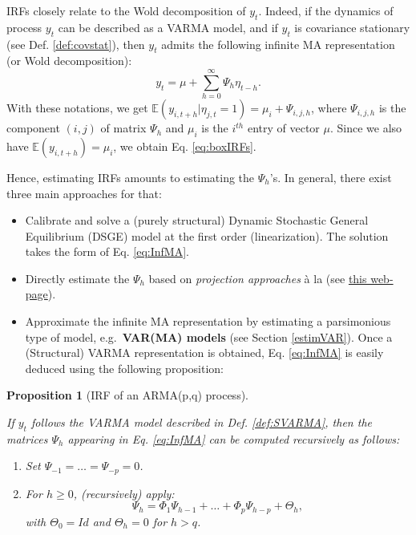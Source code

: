 \documentclass[
  12pt,
]{book}
\providecommand{\tightlist}{%
  \setlength{\itemsep}{0pt}\setlength{\parskip}{0pt}}
\newtheorem{proposition}{Proposition}[chapter]
\theoremstyle{definition}
\theoremstyle{definition}
\theoremstyle{definition}
\theoremstyle{definition}
\theoremstyle{remark}
\begin{document}
IRFs closely relate to the Wold decomposition of \(y_t\). Indeed, if the dynamics of process \(y_t\) can be described as a VARMA model, and if \(y_t\) is covariance stationary (see Def. \ref{def:covstat}), then \(y_t\) admits the following infinite MA representation (or Wold decomposition):
\begin{equation}
y_t = \mu + \sum_{h=0}^\infty \Psi_{h} \eta_{t-h}.\label{eq:InfMA}
\end{equation}
With these notations, we get \(\mathbb{E}(y_{i,t+h}|\eta_{j,t}=1) = \mu_i + \Psi_{i,j,h}\), where \(\Psi_{i,j,h}\) is the component \((i,j)\) of matrix \(\Psi_h\) and \(\mu_i\) is the \(i^{th}\) entry of vector \(\mu\). Since we also have \(\mathbb{E}(y_{i,t+h})=\mu_i\), we obtain Eq. \eqref{eq:boxIRFs}.

Hence, estimating IRFs amounts to estimating the \(\Psi_{h}\)'s. In general, there exist three main approaches for that:

\begin{itemize}
\tightlist
\item
  Calibrate and solve a (purely structural) Dynamic Stochastic General Equilibrium (DSGE) model at the first order (linearization). The solution takes the form of Eq. \eqref{eq:InfMA}.
\item
  Directly estimate the \(\Psi_{h}\) based on \emph{projection approaches} à la \citet{Jorda_2005} (see \href{https://jrenne.github.io/IdentifStructShocks/Projections.html}{this web-page}).
\item
  Approximate the infinite MA representation by estimating a parsimonious type of model, e.g.~\textbf{VAR(MA) models} (see Section \ref{estimVAR}). Once a (Structural) VARMA representation is obtained, Eq. \eqref{eq:InfMA} is easily deduced using the following proposition:
\end{itemize}

\begin{proposition}[IRF of an ARMA(p,q) process]
\protect\hypertarget{prp:computPsi}{}\label{prp:computPsi}

If \(y_t\) follows the VARMA model described in Def. \ref{def:SVARMA}, then the matrices \(\Psi_h\) appearing in Eq. \eqref{eq:InfMA} can be computed recursively as follows:

\begin{enumerate}
\def\labelenumi{\arabic{enumi}.}
\tightlist
\item
  Set \(\Psi_{-1}=\dots=\Psi_{-p}=0\).
\item
  For \(h \ge 0\), (recursively) apply:
  \[
  \Psi_h = \Phi_1 \Psi_{h-1} + \dots + \Phi_p \Psi_{h-p} + \Theta_h,
  \]
  with \(\Theta_0 = Id\) and \(\Theta_h = 0\) for \(h>q\).
\end{enumerate}

\end{proposition}
\end{document}
